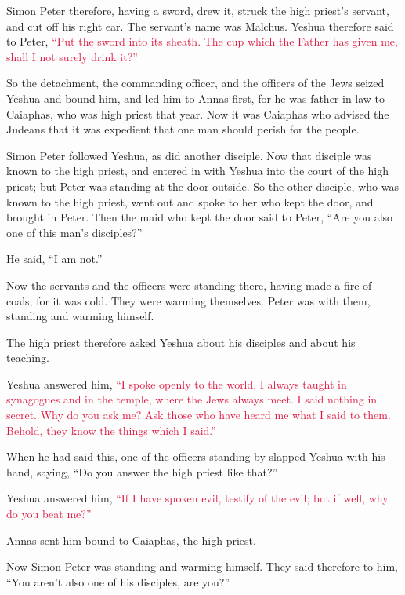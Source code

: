 \myverse{}Simon Peter therefore, having a sword, drew it, struck the high
priest’s servant, and cut off his right ear. The servant’s name was Malchus.
\myverse{}Yeshua therefore said to Peter,
\textcolor{crimson}{“Put the sword into its sheath. The cup which the Father has given me, shall I not surely drink it?”}

\myverse{}So the detachment, the commanding officer, and the officers
of the Jews seized Yeshua and bound him,
\myverse{}and led him to Annas first, for he was father-in-law to Caiaphas, who was
high priest that year.
\myverse{}Now it was Caiaphas who advised the Judeans that it was expedient that one
man should perish for the people.

\myverse{}Simon Peter followed Yeshua, as did another disciple. Now that
disciple was known to the high priest, and entered in with Yeshua into the court of the high priest;
\myverse{}but Peter was standing at the door outside. So the other disciple, who was
known to the high priest, went out and spoke to her who kept the door, and brought in Peter.
\myverse{}Then the maid who kept the door said to Peter, “Are you also one of this
man’s disciples?”

He said, “I am not.”

\myverse{}Now the servants and the officers were standing there, having
made a fire of coals, for it was cold. They were warming themselves. Peter was with them, standing and
warming himself.

\myverse{}The high priest therefore asked Yeshua about his disciples and
about his teaching.

\myverse{}Yeshua answered him,
\textcolor{crimson}{“I spoke openly to the world. I always taught in synagogues and in the temple, where the Jews always
	meet. I said nothing in secret.
}
\myverse{}\textcolor{crimson}{Why do you ask me? Ask those who have heard me what I said to them. Behold,
	they know the things which I said.”}

\myverse{}When he had said this, one of the officers standing by slapped
Yeshua with his hand, saying, “Do you answer the high priest like that?”

\myverse{}Yeshua answered him,
\textcolor{crimson}{“If I have spoken evil, testify of the evil; but if well, why do you beat me?”}

\myverse{}Annas sent him bound to Caiaphas, the high priest.

\myverse{}Now Simon Peter was standing and warming himself. They said
therefore to him, “You aren’t also one of his disciples, are you?”

